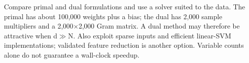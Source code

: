 Compare primal and dual formulations and use a solver suited to the data. The primal has about 100,000 weights plus a bias; the dual has 2,000 sample multipliers and a 2,000\ensuremath{\times}2,000 Gram matrix. A dual method may therefore be attractive when d\ensuremath{\gg}N. Also exploit sparse inputs and efficient linear-SVM implementations; validated feature reduction is another option. Variable counts alone do not guarantee a wall-clock speedup.
